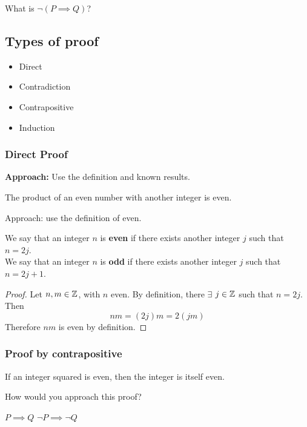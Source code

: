 \documentclass{article}
\begin{document}
What is $\neg (P \implies Q)$?



\subsection{Types of proof}
\begin{itemize}
	\item Direct
	\item Contradiction
	\item Contrapositive
	\item Induction
\end{itemize}


\subsubsection{Direct Proof}

{\bf Approach:} Use the definition and known results.
\vspace{1em}

\begin{example}
The product of an even number with another integer is even.
\end{example}

Approach: use the definition of even.

\begin{definition}
We say that an integer $n$ is {\bf even} if there exists another integer $j$ such that $n=2j$. \\
We say that an integer $n$ is {\bf odd} if there exists another integer $j$ such that $n=2j+1$.
\end{definition}

\begin{proof}
Let $n, m \in {\mathbb{Z}}$, with $n$ even. By definition, there $\exists$ $j \in {\mathbb{Z}}$ such that $n = 2j$. Then 
$$ n m  =  (2 j) m = 2 (j m)$$
Therefore $n m$ is even by definition. 
\end{proof}

\subsubsection{Proof by contrapositive}
\begin{example}
If an integer squared is even, then the integer is itself even.
\end{example}


How would you approach this proof?


$P \implies Q$  \hspace{5cm}  $\neg P \implies \neg Q$
\end{document}
